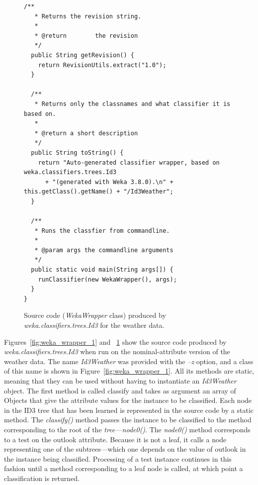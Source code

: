 \begin{figure}[!thp]
\ContinuedFloat
\begin{mdframed}[innermargin=-1cm]
\begin{Verbatim}[fontsize=\scriptsize]
/**
   * Returns the revision string.
   * 
   * @return        the revision
   */
  public String getRevision() {
    return RevisionUtils.extract("1.0");
  }

  /**
   * Returns only the classnames and what classifier it is based on.
   *
   * @return a short description
   */
  public String toString() {
    return "Auto-generated classifier wrapper, based on weka.classifiers.trees.Id3 
      + "(generated with Weka 3.8.0).\n" + this.getClass().getName() + "/Id3Weather";
  }

  /**
   * Runs the classfier from commandline.
   *
   * @param args the commandline arguments
   */
  public static void main(String args[]) {
    runClassifier(new WekaWrapper(), args);
  }
}

\end{Verbatim}
\end{mdframed}
\caption{\label{fig:weka_wrapper_2}Source code (\textit{WekaWrapper} class) produced by \textit{weka.classifiers.trees.Id3} for the weather data.}
\end{figure}

Figures~\ref{fig:weka_wrapper_1} and ~\ref{fig:weka_wrapper_2} show
the source code produced by \textit{weka.classifiers.trees.Id3} when run on the
nominal-attribute version of the weather data. The name \textit{Id3Weather} was
provided with the \textit{--z} option, and a class of this name is shown in
Figure~\ref{fig:weka_wrapper_1}. All its methods are static, meaning that they can be used
without having to instantiate an \textit{Id3Weather} object. The first method
is called classify and takes as argument an array of Objects that give
the attribute values for the instance to be classified. Each node in
the ID3 tree that has been learned is represented in the source code
by a static method. The \textit{classify()} method passes the instance to be
classified to the method corresponding to the root of the
\textit{tree—node0()}. The \textit{node0()} method corresponds to a test on the outlook
attribute. Because it is not a leaf, it calls a node representing one
of the subtrees---which one depends on the value of outlook in the
instance being classified. Processing of a test instance continues in
this fashion until a method corresponding to a leaf node is called, at
which point a classification is returned.

